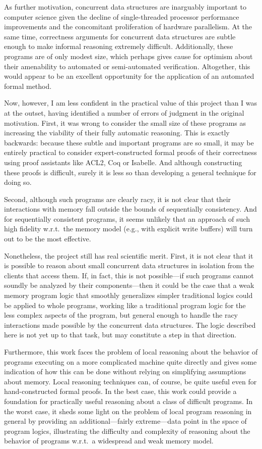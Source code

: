 \documentclass[11pt]{report}         %
\begin{document}
As further motivation, concurrent data structures are inarguably important to computer science given the decline of single-threaded processor performance improvements and the concomitant proliferation of hardware parallelism. At the same time, correctness arguments for concurrent data structures are subtle enough to make informal reasoning extremely difficult. Additionally, these programs are of only modest size, which perhaps gives cause for optimism about their amenability to automated or semi-automated verification. Altogether, this would appear to be an excellent opportunity for the application of an automated formal method. 

Now, however, I am less confident in the practical value of this project than I was at the outset, having identified a number of errors of judgment in the original motivation. First, it was wrong to consider the small size of these programs as increasing the viability of their fully automatic reasoning. This is exactly backwards: because these subtle and important programs are so small, it may be entirely practical to consider expert-constructed formal proofs of their correctness using proof assistants like ACL2, Coq or Isabelle. And although constructing these proofs is difficult, surely it is less so than developing a general technique for doing so. 

Second, although such programs are clearly racy, it is not clear that their interactions with memory fall outside the bounds of sequentially consistency. And for sequentially consistent programs, it seems unlikely that an approach of such high fidelity w.r.t.\ the memory model (e.g., with explicit write buffers) will turn out to be the most effective. 

Nonetheless, the project still has real scientific merit. First, it is not clear that it is possible to reason about small concurrent data structures in isolation from the clients that access them. If, in fact, this is not possible---if such programs cannot soundly be analyzed by their components---then it could be the case that a weak memory program logic that smoothly generalizes simpler traditional logics could be applied to whole programs, working like a traditional program logic for the less complex aspects of the program, but general enough to handle the racy interactions made possible by the concurrent data structures. The logic described here is not yet up to that task, but may constitute a step in that direction. 

Furthermore, this work faces the problem of local reasoning about the behavior of programs executing on a more complicated machine quite directly and gives some indication of how this can be done without relying on simplifying assumptions about memory. Local reasoning techniques can, of course, be quite useful even for hand-constructed formal proofs. In the best case, this work could provide a foundation for practically useful reasoning about a class of difficult programs. In the worst case, it sheds some light on the problem of local program reasoning in general by providing an additional---fairly extreme---data point in the space of program logics, illustrating the difficulty and complexity of reasoning about the behavior of programs w.r.t.\ a widespread and weak memory model. 
\end{document}
